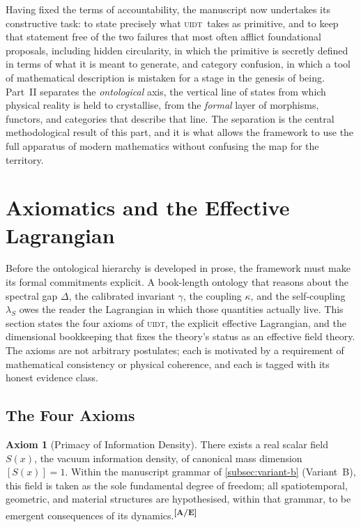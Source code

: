 \documentclass[12pt,a4paper,twoside]{article}
\theoremstyle{plain}
\theoremstyle{definition}
\newtheorem{axiom}{Axiom}
\theoremstyle{remark}
\newcommand{\UIDT}{\textsc{uidt}}
\newcommand{\catmark}[1]{\textsuperscript{\textsf{\textbf{[#1]}}}}
\newcommand{\Sx}{S(x)}
\begin{document}
\noindent Having fixed the terms of accountability, the manuscript now undertakes its constructive task: to state precisely what \UIDT\ takes as primitive, and to keep that statement free of the two failures that most often afflict foundational proposals, including hidden circularity, in which the primitive is secretly defined in terms of what it is meant to generate, and category confusion, in which a tool of mathematical description is mistaken for a stage in the genesis of being. Part~II separates the \emph{ontological} axis, the vertical line of states from which physical reality is held to crystallise, from the \emph{formal} layer of morphisms, functors, and categories that describe that line. The separation is the central methodological result of this part, and it is what allows the framework to use the full apparatus of modern mathematics without confusing the map for the territory.

\newpage
\section{Axiomatics and the Effective Lagrangian}
\label{sec:axiomatics}

\noindent Before the ontological hierarchy is developed in prose, the framework must make its formal commitments explicit. A book-length ontology that reasons about the spectral gap $\Delta$, the calibrated invariant $\gamma$, the coupling $\kappa$, and the self-coupling $\lambda_S$ owes the reader the Lagrangian in which those quantities actually live. This section states the four axioms of \UIDT, the explicit effective Lagrangian, and the dimensional bookkeeping that fixes the theory's status as an effective field theory. The axioms are not arbitrary postulates; each is motivated by a requirement of mathematical consistency or physical coherence, and each is tagged with its honest evidence class.

\subsection{The Four Axioms}
\label{subsec:four-axioms}

\begin{axiom}[Primacy of Information Density]
\label{ax:primacy}
There exists a real scalar field $\Sx$, the vacuum information density, of canonical mass dimension $[\Sx]=1$. Within the manuscript grammar of \cref{subsec:variant-b} (Variant~B), this field is taken as the sole fundamental degree of freedom; all spatiotemporal, geometric, and material structures are hypothesised, within that grammar, to be emergent consequences of its dynamics.\catmark{A/E}
\end{axiom}
\end{document}
